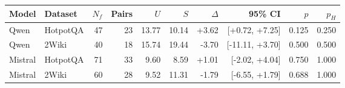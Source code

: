 \begin{tabular}{@{}llrrrrrrrr@{}}
\toprule
Model & Dataset & $N_f$ & Pairs & $U$ & $S$ & $\Delta$ & 95\% CI & $p$ & $p_H$ \\
\midrule
Qwen & HotpotQA & 47 & 23 & 13.77 & 10.14 & +3.62 & [+0.72, +7.25] & 0.125 & 0.250 \\
Qwen & 2Wiki & 40 & 18 & 15.74 & 19.44 & -3.70 & [-11.11, +3.70] & 0.500 & 0.500 \\
Mistral & HotpotQA & 71 & 33 & 9.60 & 8.59 & +1.01 & [-2.02, +4.04] & 0.750 & 1.000 \\
Mistral & 2Wiki & 60 & 28 & 9.52 & 11.31 & -1.79 & [-6.55, +1.79] & 0.688 & 1.000 \\
\bottomrule
\end{tabular}
